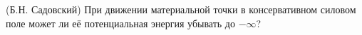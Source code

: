 (Б.Н. Садовский)
При движении материальной точки в консервативном силовом поле может ли
её потенциальная энергия убывать до $-\infty$?
